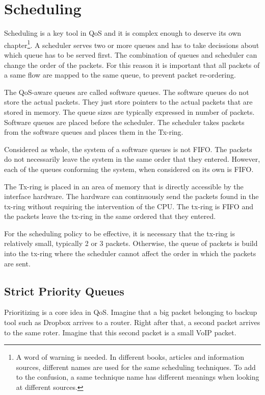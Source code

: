 \chapter{Scheduling}

Scheduling is a key tool in QoS and it is complex enough to deserve its own chapter\footnote{A word of warning is needed. In different books, articles and information sources, different names are used for the same scheduling techniques. To add to the confusion, a same technique name has different meanings when looking at different sources.}.
A scheduler serves two or more queues and has to take decissions about which queue has to be served first.
The combination of queues and scheduler can change the order of the packets.
For this reason it is important that all packets of a same flow are mapped to the same queue, to prevent packet re-ordering.

The QoS-aware queues are called software queues.
The software queues do not store the actual packets. 
They just store pointers to the actual packets that are stored in memory.
The queue sizes are typically expressed in number of packets.
Software queues are placed before the scheduler.
The scheduler takes packets from the software queues and places them in the Tx-ring.

Considered as whole, the system of a software queues is not FIFO.
The packets do not necessarily leave the system in the same order that they entered.
However, each of the queues conforming the system, when considered on its own is FIFO.

The Tx-ring is placed in an area of memory that is directly accessible by the interface hardware.
The hardware can continuously send the packets found in the tx-ring without requiring the intervention of the CPU.
The tx-ring is FIFO and the packets leave the tx-ring in the same ordered that they entered.

For the scheduling policy to be effective, it is necessary that the tx-ring is relatively small, typically 2 or 3 packets.
Otherwise, the queue of packets is build into the tx-ring where the scheduler cannot affect the order in which the packets are sent.


\section{Strict Priority Queues}

Prioritizing is a core idea in QoS.
Imagine that a big packet belonging to backup tool such as Dropbox arrives to a router.
Right after that, a second packet arrives to the same roter.
Imagine that this second packet is a small VoIP packet.

